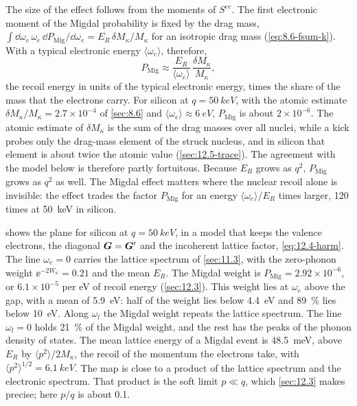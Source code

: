 The size of the effect follows from the moments of $S^{ee}$. The first electronic moment of the Migdal probability is fixed by the drag mass, $\int\dd\omega_e\,\omega_e\,\dd P_{\mathrm{Mig}}/\dd\omega_e = E_R\,\delta M_\kappa/M_\kappa$ for an isotropic drag mass (\cref{eq:8.6-fsum-k}). With a typical electronic energy $\langle\omega_e\rangle$, therefore,
\begin{equation*}
  P_{\mathrm{Mig}} \approx \frac{E_R}{\langle\omega_e\rangle}\,\frac{\delta M_\kappa}{M_\kappa} ,
\end{equation*}
the recoil energy in units of the typical electronic energy, times the share of the mass that the electrons carry. For silicon at $q = \SI{50}{keV}$, with the atomic estimate $\delta M_\kappa/M_\kappa = 2.7\times10^{-4}$ of \cref{sec:8.6} and $\langle\omega_e\rangle \approx \SI{6}{eV}$, $P_{\mathrm{Mig}}$ is about $2\times10^{-6}$. The atomic estimate of $\delta M_\kappa$ is the sum of the drag masses over all nuclei, while a kick probes only the drag-mass element of the struck nucleus, and in silicon that element is about twice the atomic value (\cref{sec:12.5-trace}). The agreement with the model below is therefore partly fortuitous. Because $E_R$ grows as $q^2$, $P_{\mathrm{Mig}}$ grows as $q^2$ as well. The Migdal effect matters where the nuclear recoil alone is invisible: the effect trades the factor $P_{\mathrm{Mig}}$ for an energy $\langle\omega_e\rangle/E_R$ times larger, 120 times at \SI{50}{keV} in silicon.

 shows the plane for silicon at $q = \SI{50}{keV}$, in a model that keeps the valence electrons, the diagonal $\bm{G} = \bm{G}'$ and the incoherent lattice factor, \cref{eq:12.4-harm}. The line $\omega_e = 0$ carries the lattice spectrum of \cref{sec:11.3}, with the zero-phonon weight $\ee^{-2W_\kappa} = 0.21$ and the mean $E_R$. The Migdal weight is $P_{\mathrm{Mig}} = 2.92\times10^{-6}$, or $6.1\times10^{-5}$ per eV of recoil energy (\cref{sec:12.3}). This weight lies at $\omega_e$ above the gap, with a mean of \SI{5.9}{eV}: half of the weight lies below \SI{4.4}{eV} and \SI{89}{\percent} lies below \SI{10}{eV}. Along $\omega_l$ the Migdal weight repeats the lattice spectrum. The line $\omega_l = 0$ holds \SI{21}{\percent} of the Migdal weight, and the rest has the peaks of the phonon density of states. The mean lattice energy of a Migdal event is \SI{48.5}{meV}, above $E_R$ by $\langle p^2\rangle/2M_\kappa$, the recoil of the momentum the electrons take, with $\langle p^2\rangle^{1/2} = \SI{6.1}{keV}$. The map is close to a product of the lattice spectrum and the electronic spectrum. That product is the soft limit $p \ll q$, which \cref{sec:12.3} makes precise; here $p/q$ is about 0.1.

